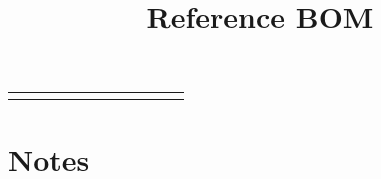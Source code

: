 \documentclass[fontsize = 9pt, BCOR=1.5cm, DIV=14, twoside, titlepage = false, landscape]{scrartcl}
\title{\configname  Reference BOM}
\subtitle{}
\author{}
\date{}
\makeatletter
\def\cleardoublepage{\clearpage%
    \if@twoside
      \ifodd\c@page\else
	\section*{Notes}
	\newpage
	\if@twocolumn\hbox{}\newpage\fi
      \fi
    \fi
  }
\makeatother
\begin{document}
\pagestyle{scrheadings}
\maketitle
\thispagestyle{scrheadings}
\begin{center}
\keepXColumns
\renewcommand{\arraystretch}{1.1}
\begin{tabularx}{1.0\textwidth}{>{\centering\arraybackslash}p{}|>{\centering\arraybackslash}p{}|>{\centering\arraybackslash}p{}|>{\centering\arraybackslash}p{}|>{\centering\arraybackslash}p{}|>{\centering\arraybackslash}p{}|>{\centering\arraybackslash}p{}|>{\centering\arraybackslash}p{}|>{\centering\arraybackslash}p{}|>{\centering\arraybackslash}p{}|>{\centering\arraybackslash}p{}|}
  \hline
  \multicolumn{11}{|c|}{\cellcolor[gray]{0.8}\normalsize\textbf{BOM}}\tabularnewline\hline
  \rowcolor[gray]{0.9}\multicolumn{1}{|c|}{%
  \multicolumn{1}{|c|}{\cellcolor[gray]{0.9} %
\end{tabularx}

\end{center}
\cleardoublepage
\end{document}
